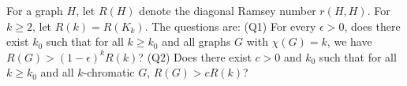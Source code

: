 For a graph $H$, let $R(H)$ denote the diagonal Ramsey number $r(H,H)$. For $k\ge 2$, let
$R(k)=R(K_k)$. The questions are:
(Q1) For every $\epsilon>0$, does there exist $k_0$ such that for all $k\ge k_0$ and all graphs $G$
with $\chi(G)=k$, we have $R(G)>(1-\epsilon)^k R(k)$?
(Q2) Does there exist $c>0$ and $k_0$ such that for all $k\ge k_0$ and all $k$-chromatic $G$,
$R(G)>cR(k)$?
